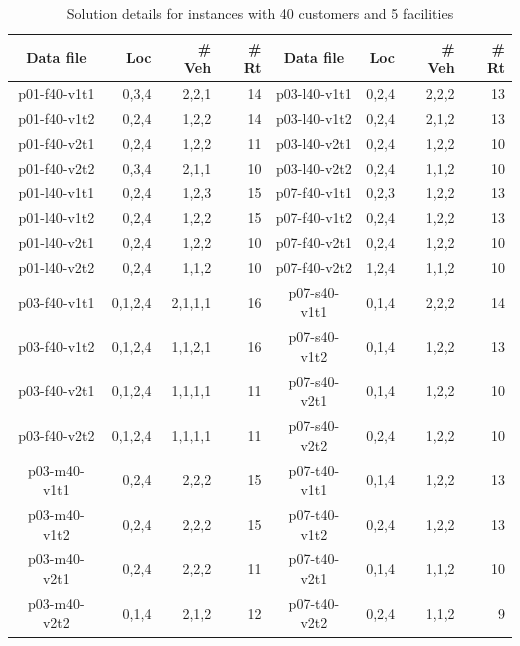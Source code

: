 \begin{table}[!htbp]
\centering
\caption{Solution details for instances with 40 customers and 5 facilities}\label{40Cust_res3}
\begin {tabular}[!h]{|c|r|r|r|c|r|r|r|}
\hline
Data file &  Loc  & \# Veh & \# Rt & Data file &  Loc & \# Veh & \# Rt \\\hline
p01-f40-v1t1 &  0,3,4 & 2,2,1   & 14    & p03-l40-v1t1  & 0,2,4 & 2,2,2 & 13    \\
p01-f40-v1t2 &  0,2,4 & 1,2,2   & 14    & p03-l40-v1t2  & 0,2,4 & 2,1,2 & 13    \\
p01-f40-v2t1 &  0,2,4 & 1,2,2   & 11    & p03-l40-v2t1  & 0,2,4 & 1,2,2 & 10    \\
p01-f40-v2t2 &  0,3,4 & 2,1,1   & 10    & p03-l40-v2t2  & 0,2,4 & 1,1,2 & 10    \\\hline
p01-l40-v1t1 &  0,2,4 & 1,2,3   & 15    & p07-f40-v1t1  & 0,2,3 & 1,2,2 & 13    \\
p01-l40-v1t2 &  0,2,4 & 1,2,2   & 15    & p07-f40-v1t2  & 0,2,4 & 1,2,2 & 13    \\
p01-l40-v2t1 &  0,2,4 & 1,2,2   & 10    & p07-f40-v2t1  & 0,2,4 & 1,2,2 & 10    \\
p01-l40-v2t2 &  0,2,4 & 1,1,2   & 10    & p07-f40-v2t2  & 1,2,4 & 1,1,2 & 10    \\\hline
p03-f40-v1t1 &  0,1,2,4 & 2,1,1,1 & 16  & p07-s40-v1t1  & 0,1,4 & 2,2,2 & 14    \\
p03-f40-v1t2 &  0,1,2,4 & 1,1,2,1 & 16  & p07-s40-v1t2  & 0,1,4 & 1,2,2 & 13    \\
p03-f40-v2t1 &  0,1,2,4 & 1,1,1,1 & 11  & p07-s40-v2t1  & 0,1,4 & 1,2,2 & 10    \\
p03-f40-v2t2 &  0,1,2,4 & 1,1,1,1 & 11  & p07-s40-v2t2  & 0,2,4 & 1,2,2 & 10    \\\hline
p03-m40-v1t1 &  0,2,4   & 2,2,2 & 15    & p07-t40-v1t1  & 0,1,4 & 1,2,2 & 13    \\
p03-m40-v1t2 &  0,2,4   & 2,2,2 & 15    & p07-t40-v1t2  & 0,2,4 & 1,2,2 & 13    \\
p03-m40-v2t1 &  0,2,4   & 2,2,2 & 11    & p07-t40-v2t1  & 0,1,4 & 1,1,2 & 10    \\
p03-m40-v2t2 &  0,1,4   & 2,1,2 & 12    & p07-t40-v2t2  & 0,2,4 & 1,1,2 & 9 \\\hline
\end{tabular}
\end{table}

